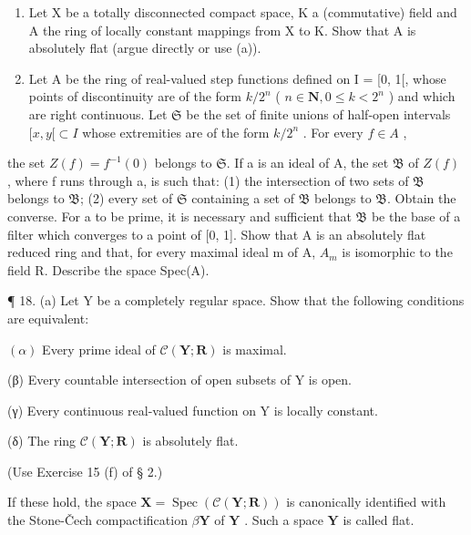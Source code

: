\begin{enumerate}
\def\labelenumi{(\alph{enumi})}
\setcounter{enumi}{1}
\item
  Let X be a totally disconnected compact space, K a (commutative) field and A the ring of locally constant mappings from X to K. Show that A is absolutely flat (argue directly or use (a)).
\item
  Let A be the ring of real-valued step functions defined on I = {[}0, 1{[}, whose points of discontinuity are of the form \(k/2^n\) ( \(n \in \mathbf{N}, 0 \leqslant k < 2^n\) ) and which are right continuous. Let \(\mathfrak{S}\) be the set of finite unions of half-open intervals \([x, y[ \subset I\) whose extremities are of the form \(k/2^n\) . For every \(f \in A\) ,
\end{enumerate}

the set \(Z(f) = f^{-1}(0)\) belongs to \(\mathfrak{S}\). If a is an ideal of A, the set \(\mathfrak{B}\) of \(Z(f)\) , where f runs through a, is such that: (1) the intersection of two sets of \(\mathfrak{B}\) belongs to \(\mathfrak{B}\); (2) every set of \(\mathfrak{S}\) containing a set of \(\mathfrak{B}\) belongs to \(\mathfrak{B}\). Obtain the converse. For a to be prime, it is necessary and sufficient that \(\mathfrak{B}\) be the base of a filter which converges to a point of {[}0, 1{]}. Show that A is an absolutely flat reduced ring and that, for every maximal ideal m of A, \(A_{m}\) is isomorphic to the field R. Describe the space Spec(A).

¶ 18. (a) Let Y be a completely regular space. Show that the following conditions are equivalent:

\((\alpha)\) Every prime ideal of \(\mathcal{C}(\mathbf{Y};\mathbf{R})\) is maximal.

(β) Every countable intersection of open subsets of Y is open.

(γ) Every continuous real-valued function on Y is locally constant.

(δ) The ring \(\mathcal{C}(\mathbf{Y};\mathbf{R})\) is absolutely flat.

(Use Exercise 15 (f) of § 2.)

If these hold, the space \(\mathbf{X} = \operatorname{Spec}(\mathcal{C}(\mathbf{Y};\mathbf{R}))\) is canonically identified with the Stone-Čech compactification \(\beta \mathbf{Y}\) of \(\mathbf{Y}\) . Such a space \(\mathbf{Y}\) is called flat.

